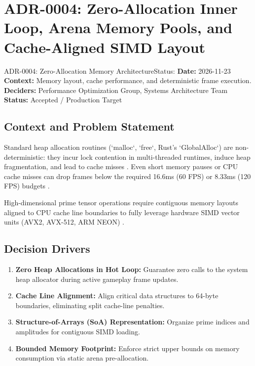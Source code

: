 \section{ADR-0004: Zero-Allocation Inner Loop, Arena Memory Pools, and Cache-Aligned SIMD Layout}
\label{sec:adr0004}

\begin{adrbox}{ADR-0004: Zero-Allocation Memory Architecture}{Status: }
\textbf{Date:} 2026-11-23 \\
\textbf{Context:} Memory layout, cache performance, and deterministic frame execution. \\
\textbf{Deciders:} Performance Optimization Group, Systems Architecture Team \\
\textbf{Status:} Accepted / Production Target
\end{adrbox}

\subsection{Context and Problem Statement}
Standard heap allocation routines (`malloc`, `free`, Rust's `GlobalAlloc`) are non-deterministic: they incur lock contention in multi-threaded runtimes, induce heap fragmentation, and lead to cache misses \cite{gregory2018game, intel2023optimization}. Even short memory pauses or CPU cache misses can drop frames below the required 16.6ms (60 FPS) or 8.33ms (120 FPS) budgets \cite{gregory2018game}.

High-dimensional prime tensor operations require contiguous memory layouts aligned to CPU cache line boundaries to fully leverage hardware SIMD vector units (AVX2, AVX-512, ARM NEON) \cite{intel2023optimization}.

\subsection{Decision Drivers}
\begin{enumerate}[label=\bfseries D\arabic*.]
    \item \textbf{Zero Heap Allocations in Hot Loop:} Guarantee zero calls to the system heap allocator during active gameplay frame updates.
    \item \textbf{Cache Line Alignment:} Align critical data structures to 64-byte boundaries, eliminating split cache-line penalties.
    \item \textbf{Structure-of-Arrays (SoA) Representation:} Organize prime indices and amplitudes for contiguous SIMD loading.
    \item \textbf{Bounded Memory Footprint:} Enforce strict upper bounds on memory consumption via static arena pre-allocation.
\end{enumerate}

